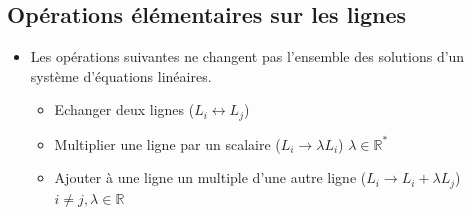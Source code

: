 \documentclass[12pt,a4paper]{article}
\begin{document}
\subsection{Opérations élémentaires sur les lignes}
\begin{itemize}[label=$\bullet$]
\item Les opérations suivantes ne changent pas l'ensemble des solutions d'un système d'équations linéaires.
\begin{itemize}
    \item \textcolor{th!60!black}{Echanger} deux lignes ($L_i \leftrightarrow
 L_j$)
 \item \textcolor{th!60!black}{Multiplier} une ligne par un scalaire ($L_i \rightarrow \lambda L_i$) \hspace{0.2cm} $\lambda\in\mathbb{R}^*$ 
 \item \textcolor{th!60!black}{Ajouter} à une ligne un multiple d'une autre ligne ($L_i \rightarrow L_i + \lambda L_j$) \\ $i\neq j, \lambda\in\mathbb{R}$
\end{itemize}
\end{itemize}
\end{document}
